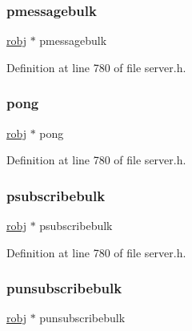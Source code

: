 \subsubsection{\texorpdfstring{pmessagebulk}{pmessagebulk}}
{\footnotesize\ttfamily \hyperlink{server_8h_a540f174d2685422fbd7d12e3cd44c8e2}{robj} $\ast$ pmessagebulk}



Definition at line 780 of file server.\+h.

\mbox{\label{structshared_objects_struct_a0d9dc084f22782d4cf6740dca7c606f5}} 
\subsubsection{\texorpdfstring{pong}{pong}}
{\footnotesize\ttfamily \hyperlink{server_8h_a540f174d2685422fbd7d12e3cd44c8e2}{robj} $\ast$ pong}



Definition at line 780 of file server.\+h.

\mbox{\label{structshared_objects_struct_add3893894b8fb0a0f7d3a4c182ef4e9e}} 
\subsubsection{\texorpdfstring{psubscribebulk}{psubscribebulk}}
{\footnotesize\ttfamily \hyperlink{server_8h_a540f174d2685422fbd7d12e3cd44c8e2}{robj} $\ast$ psubscribebulk}



Definition at line 780 of file server.\+h.

\mbox{\label{structshared_objects_struct_a18e82c193f4ef2d57caf0eb697679596}} 
\subsubsection{\texorpdfstring{punsubscribebulk}{punsubscribebulk}}
{\footnotesize\ttfamily \hyperlink{server_8h_a540f174d2685422fbd7d12e3cd44c8e2}{robj} $\ast$ punsubscribebulk}



